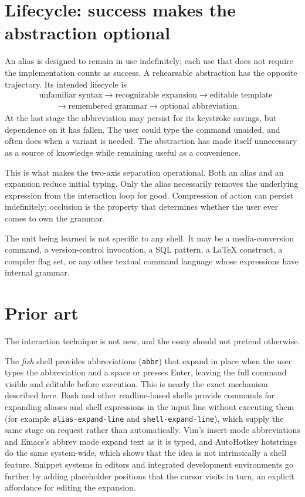 \documentclass[11pt]{article}
\theoremstyle{remark}
\newcommand{\cmd}[1]{\texttt{#1}}
\begin{document}
\section{Lifecycle: success makes the abstraction optional}

An alias is designed to remain in use indefinitely; each use that does not require the implementation counts as success. A rehearsable abstraction has the opposite trajectory. Its intended lifecycle is
\[
\begin{aligned}
&\text{unfamiliar syntax} \to \text{recognizable expansion} \to \text{editable template}\\
&\qquad\to \text{remembered grammar} \to \text{optional abbreviation}.
\end{aligned}
\]
At the last stage the abbreviation may persist for its keystroke savings, but dependence on it has fallen. The user could type the command unaided, and often does when a variant is needed. The abstraction has made itself unnecessary as a source of knowledge while remaining useful as a convenience.

This is what makes the two-axis separation operational. Both an alias and an expansion reduce initial typing. Only the alias necessarily removes the underlying expression from the interaction loop for good. Compression of action can persist indefinitely; occlusion is the property that determines whether the user ever comes to own the grammar.

The unit being learned is not specific to any shell. It may be a media-conversion command, a version-control invocation, a SQL pattern, a LaTeX construct, a compiler flag set, or any other textual command language whose expressions have internal grammar.

\section{Prior art}

The interaction technique is not new, and the essay should not pretend otherwise.

The \emph{fish} shell provides abbreviations (\cmd{abbr}) that expand in place when the user types the abbreviation and a space or presses Enter, leaving the full command visible and editable before execution. This is nearly the exact mechanism described here. Bash and other readline-based shells provide commands for expanding aliases and shell expressions in the input line without executing them (for example \cmd{alias-expand-line} and \cmd{shell-expand-line}), which supply the same stage on request rather than automatically. Vim's insert-mode abbreviations and Emacs's abbrev mode expand text as it is typed, and AutoHotkey hotstrings do the same system-wide, which shows that the idea is not intrinsically a shell feature. Snippet systems in editors and integrated development environments go further by adding placeholder positions that the cursor visits in turn, an explicit affordance for editing the expansion.
\end{document}
